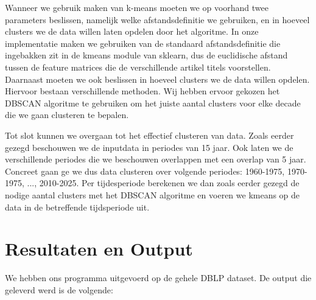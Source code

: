 \documentclass[11pt]{article}
\begin{document}
Wanneer we gebruik maken van k-means moeten we op voorhand twee parameters beslissen, namelijk welke afstandsdefinitie we gebruiken, en in hoeveel clusters we de data willen laten opdelen door het algoritme. In onze implementatie maken we gebruiken van de standaard afstandsdefinitie die ingebakken zit in de kmeans module van sklearn, dus de euclidische afstand tussen de feature matrices die de verschillende artikel titels voorstellen. Daarnaast moeten we ook beslissen in hoeveel clusters we de data willen opdelen. Hiervoor bestaan verschillende methoden. Wij hebben ervoor gekozen het DBSCAN algoritme te gebruiken om het juiste aantal clusters voor elke decade die we gaan clusteren te bepalen. 

Tot slot kunnen we overgaan tot het effectief clusteren van data. Zoals eerder gezegd beschouwen we de inputdata in periodes van 15 jaar. Ook laten we de verschillende periodes die we beschouwen overlappen met een overlap van 5 jaar. Concreet gaan ge we dus data clusteren over volgende periodes: 1960-1975, 1970-1975, ..., 2010-2025. Per tijdesperiode berekenen we dan zoals eerder gezegd de nodige aantal clusters met het DBSCAN algoritme en voeren we kmeans op de data in de betreffende tijdsperiode uit. 

\section{Resultaten en Output}

We hebben ons programma uitgevoerd op de gehele DBLP dataset. De output die geleverd werd is de volgende:
\end{document}
